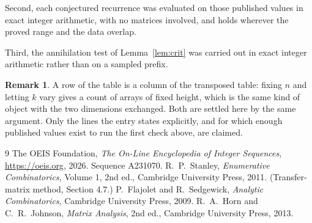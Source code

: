 \documentclass[11pt,a4paper]{article}
\theoremstyle{plain}
\theoremstyle{definition}
\newtheorem{remark}[theorem]{Remark}
\begin{document}
Second, each conjectured recurrence was evaluated on those published values in exact
integer arithmetic, with no matrices involved, and holds wherever the proved range and the
data overlap.

Third, the annihilation test of Lemma~\ref{lem:crit} was carried out in exact integer
arithmetic rather than on a sampled prefix.

\begin{remark}
A row of the table is a column of the transposed table: fixing $n$ and letting $k$ vary gives a
count of arrays of fixed height, which is the same kind of object with the two dimensions
exchanged. Both are settled here by the same argument. Only the lines the entry states
explicitly, and for which enough published values exist to run the first check above, are
claimed.
\end{remark}

\begin{thebibliography}{9}
 The OEIS Foundation, \emph{The On-Line Encyclopedia of Integer
Sequences}, \url{https://oeis.org}, 2026. Sequence A231070.
 R.~P.~Stanley, \emph{Enumerative Combinatorics}, Volume 1, 2nd ed.,
Cambridge University Press, 2011. (Transfer-matrix method, Section 4.7.)
 P.~Flajolet and R.~Sedgewick, \emph{Analytic Combinatorics}, Cambridge
University Press, 2009.
 R.~A.~Horn and C.~R.~Johnson, \emph{Matrix Analysis}, 2nd ed., Cambridge
University Press, 2013.
\end{thebibliography}
\end{document}
